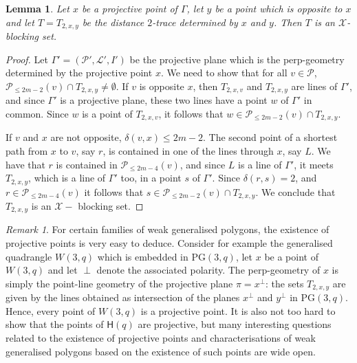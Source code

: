 \documentclass[12pt]{article}
\newcommand{\PG}{\mathrm{PG}}
\newcommand{\Points}{\mathcal{P}}
\newcommand{\Lines}{\mathcal{L}}
\newcommand{\SCHex}{\mathsf{H}}
\newtheorem{lemma}{Lemma}
\theoremstyle{remark}
\newtheorem{remark}{Remark}
\begin{document}
\begin{lemma}
    Let $x$ be a projective point of $\Gamma$, let $y$ be a point which is opposite to $x$ and let $T=T_{2,x,y}$ be the distance $2$-trace determined by $x$ and $y$. Then $T$ is an $\mathcal{X}$-blocking set.
\end{lemma}
\begin{proof}
    Let $\Gamma'=(\Points',\Lines',I')$ be the projective plane which is the perp-geometry determined by the projective point $x$. We need to show that for all $v\in \Points$, $\Points_{\leq 2m-2}(v)\cap T_{2,x,y}\neq \emptyset$. If $v$ is opposite $x$, then $T_{2,x,v}$ and $T_{2,x,y}$ are lines of $\Gamma'$, and since $\Gamma'$ is a projective plane, these two lines have a point $w$ of $\Gamma'$ in common. Since $w$ is a point of $T_{2,x,v}$, it follows that $w\in \Points_{\leq 2m-2}(v)\cap T_{2,x,y}.$
    
    If $v$ and $x$ are not opposite, $\delta(v,x)\leq 2m-2$. The second point of a shortest path from $x$ to $v$, say $r$, is contained in one of the lines through $x$, say $L$. We have that $r$ is contained in $\Points_{\leq 2m-4}(v)$, and since $L$ is a line of $\Gamma'$, it meets $T_{2,x,y}$, which is a line of $\Gamma'$ too, in a point $s$ of $\Gamma'$. Since $\delta(r,s)=2$, and $r\in \Points_{\leq 2m-4}(v)$ it follows that $s\in \Points_{\leq 2m-2}(v)\cap T_{2,x,y}.$ 
    We conclude that $T_{2,x,y}$ is an $\mathcal{X}-$ blocking set.
\end{proof}




\begin{remark} \label{remark:W3q} For certain families of weak generalised polygons, the existence of projective points is very easy to deduce. Consider for example the generalised quadrangle $W(3,q)$ which is embedded in $\PG(3,q)$, let $x$ be a point of $W(3,q)$ and let $\perp$ denote the associated polarity. The perp-geometry of $x$ is simply the point-line geometry of the projective plane $\pi=x^\perp$: the sets $T_{2,x,y}$ are given by the lines obtained as intersection of the planes $x^\perp$ and $y^\perp$ in $\PG(3,q)$. Hence, every point of $W(3,q)$ is a projective point.
It is also not too hard to show that the points of \(\SCHex(q)\) are projective, but many interesting questions related to the existence of projective points and characterisations of weak generalised polygons based on the existence of such points are wide open. 
\end{remark}
\end{document}
